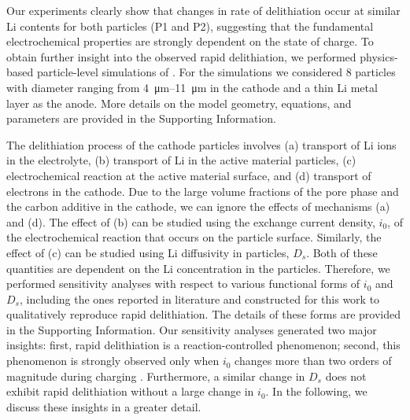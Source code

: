 \documentclass{article}
\begin{document}

Our experiments clearly show that changes in rate of delithiation
occur at similar Li contents for both particles (P1 and P2),
suggesting that the fundamental electrochemical properties are
strongly dependent on the state of charge. To obtain further insight
into the observed rapid delithiation, we performed physics-based
particle-level simulations of \nca{}. For the simulations we
considered 8 particles with diameter ranging from
\SIrange{4}{11}{\micro\meter} in the cathode and a thin Li metal layer
as the anode. More details on the model geometry, equations, and
parameters are provided in the Supporting Information.

The delithiation process of the cathode particles involves (a)
transport of Li ions in the electrolyte, (b) transport of Li in the
active material particles, (c) electrochemical reaction at the active
material surface, and (d) transport of electrons in the cathode. Due
to the large volume fractions of the pore phase and the carbon
additive in the cathode, we can ignore the effects of mechanisms (a)
and (d). The effect of (b) can be studied using the exchange current
density, $i_0$, of the electrochemical reaction that occurs on the
particle surface. Similarly, the effect of (c) can be studied using Li
diffusivity in particles, $D_s$. Both of these quantities are
dependent on the Li concentration in the particles. Therefore, we
performed sensitivity analyses with respect to various functional
forms of $i_0$ and $D_s$, including the ones reported in literature
and constructed for this work to qualitatively reproduce rapid
delithiation. The details of these forms are provided in the
Supporting Information. Our sensitivity analyses generated two major
insights: first, rapid delithiation is a reaction-controlled
phenomenon; second, this phenomenon is strongly observed only when
$i_0$ changes more than two orders of magnitude during charging
. Furthermore, a similar change in $D_s$ does not exhibit rapid
delithiation without a large change in $i_0$. In the following, we
discuss these insights in a greater detail.
\end{document}
